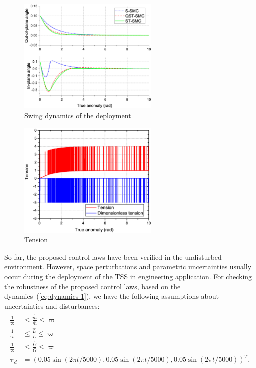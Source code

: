 \documentclass[3p]{elsarticle}
\theoremstyle{plain}
\theoremstyle{remark}
\begin{document}
\begin{figure}
\centering
\includegraphics[width=0.6\textwidth]{paper4_fig5.eps}
\caption{Swing dynamics of the deployment}
\label{fig:5}
\end{figure}
\begin{figure}
\centering
\includegraphics[width=0.6\textwidth]{paper4_fig6.eps}
\caption{Tension}
\label{fig:6}
\end{figure}
So far, the proposed control laws have been verified in the undisturbed environment. However, space perturbations and parametric uncertainties usually occur during the deployment of the TSS in engineering application. For checking the robustness of the proposed control laws, based on the dynamics~(\ref{eq:dynamics 1}), we have the following assumptions about uncertainties and disturbances:
\begin{align}\begin{split}
\frac{1}{\varpi}&\le\frac{\hat{\bar m}}{\bar m}\le \varpi\\
\frac{1}{\varpi}&\le\frac{\hat L}{L}\le \varpi\\
\frac{1}{\varpi}&\le\frac{\hat \Omega}{\Omega}\le \varpi\\
\bm\tau_d&=\left(0.05\sin(2\pi t/5000),0.05\sin(2\pi t/5000),0.05\sin(2\pi t/5000)\right)^T,
\end{split}\end{align}
\end{document}
